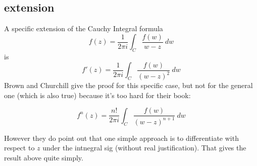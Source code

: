 \documentclass[11pt, oneside]{article}   	%
\begin{document}
\subsection*{extension}
A specific extension of the Cauchy Integral formula 
\[ f(z) = \frac{1}{2 \pi i} \int_C \frac{f(w)}{w - z} \ dw \]
is
\[ f'(z) = \frac{1}{2 \pi i} \int_C \frac{f(w)}{(w - z)^2} \ dw \]
Brown and Churchill give the proof for this specific case, but not for the general one (which is also true) because it's too hard for their book:

\[ f^n(z) = \frac{n!}{2 \pi i} \int_C \frac{f(w)}{(w - z)^{n+1}} \ dw \]

However they do point out that one simple approach is to differentiate with respect to $z$ under the intnegral sig (without real justification).  That gives the result above quite simply.
\end{document}
